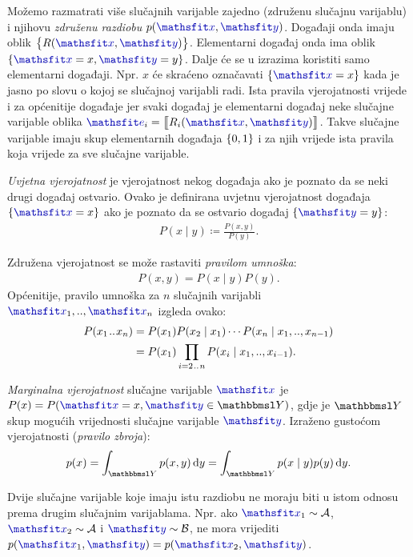 \documentclass[utf8, diplomski, lmodern]{fer}
\begin{document}
Možemo razmatrati više slučajnih varijable zajedno (združenu slučajnu varijablu) i njihovu \emph{združenu razdiobu} $p(\rvar x,\rvar y)$. Događaji onda imaju oblik $\cbr{R(\rvar x,\rvar y)}$. Elementarni događaj onda ima oblik $\cbr{\rvar x=x, \rvar y=y}$. Dalje će se u izrazima koristiti samo elementarni događaji. Npr. $x$ će skraćeno označavati $\cbr{\rvar x=x}$ kada je jasno po slovu o kojoj se slučajnoj varijabli radi. Ista pravila vjerojatnosti vrijede i za općenitije događaje jer svaki događaj je elementarni događaj neke slučajne varijable oblika $\rvar e_i = \enbbracket{R_i(\rvar x, \rvar y)}$. Takve slučajne varijable imaju skup elementarnih događaja $\cbr{0,1}$ i za njih vrijede ista pravila koja vrijede za sve slučajne varijable.

\emph{Uvjetna vjerojatnost} je vjerojatnost nekog događaja ako je poznato da se neki drugi događaj ostvario. Ovako je definirana uvjetnu vjerojatnost događaja $\cbr{\rvar x=x}$ ako je poznato da se ostvario događaj $\cbr{\rvar y=y}$:
\begin{align} \label{eq:uvjetna-vj}
P(x\mid y) \coloneqq \frac{P(x,y)}{P(y)}  \text{.}
\end{align}

Združena vjerojatnost se može rastaviti \emph{pravilom umnoška}: 
\begin{align} \label{eq:pravilo-umnoska}
P(x,y) = P(x\mid y)P(y) \text{.}
\end{align}
Općenitije, pravilo umnoška za $n$ slučajnih varijabli $\rvar x_1,..,\rvar x_n$ izgleda ovako:
\begin{align} \label{eq:pravilo-umnoska}
P(x_1\mkern1.5mu{..}\mkern1.5mu x_n) 
&= P(x_1)P(x_2\mid x_1)\cdots P(x_n\mid x_1,..,x_{n-1})  \\
&= P(x_1)\prod_{i=2\mkern1.5mu{..}\mkern1.5mu n}P(x_i\mid x_1,..,x_{i-1})  \text{.}
\end{align}

\emph{Marginalna vjerojatnost} slučajne varijable $\rvar x$ je $P(x) = P(\rvar x=x,\rvar y\in\set Y)$, gdje je $\set Y$ skup mogućih vrijednosti slučajne varijable $\rvar y$. Izraženo gustoćom vjerojatnosti (\emph{pravilo zbroja}):
\begin{align}
p(x) = \int_{\set Y} p(x,y)\dif y = \int_{\set Y} p(x\mid y)p(y)\dif y \text{.}
\end{align}

Dvije slučajne varijable koje imaju istu razdiobu ne moraju biti u istom odnosu prema drugim slučajnim varijablama. Npr. ako $\rvar x_1\sim\mathcal A$, $\rvar x_2\sim\mathcal A$ i $\rvar y\sim\mathcal B$, ne mora vrijediti $p(\rvar x_1, \rvar y) = p(\rvar x_2, \rvar y)$.
\end{document}
